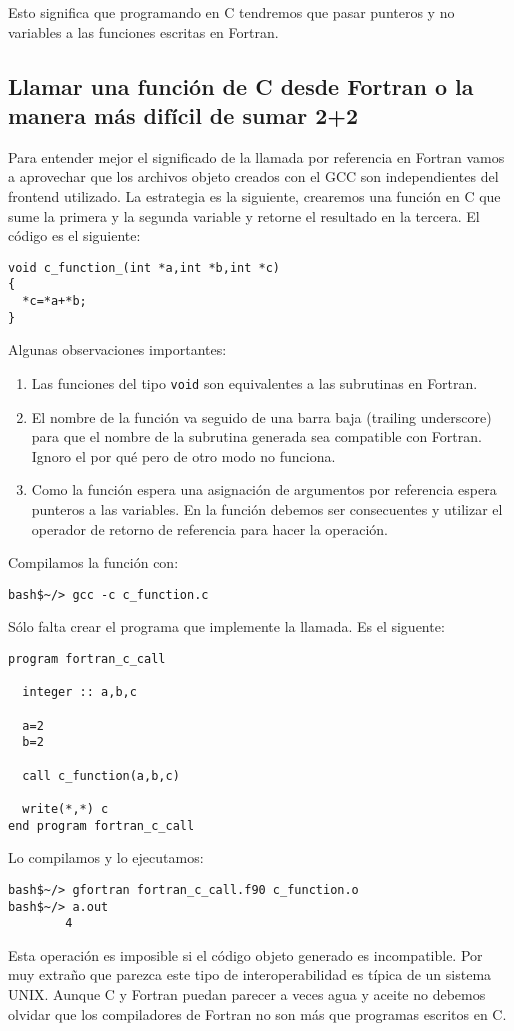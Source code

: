 Esto significa que programando en C tendremos que pasar punteros y no
variables a las funciones escritas en Fortran.


\subsection{Llamar una función de C desde Fortran o la manera más difícil de sumar 2+2}

Para entender mejor el significado de la llamada por referencia en
Fortran vamos a aprovechar que los archivos objeto creados con el GCC
son independientes del frontend utilizado.  La estrategia es la
siguiente, crearemos una función en C que sume la primera y la segunda
variable y retorne el resultado en la tercera.  El código es el
siguiente:
\begin{verbatim}
void c_function_(int *a,int *b,int *c)
{
  *c=*a+*b;
}
\end{verbatim}
Algunas observaciones importantes:
\begin{enumerate}
\item Las funciones del tipo \texttt{void} son equivalentes a las
  subrutinas en Fortran.
\item El nombre de la función va seguido de una barra baja (trailing
  underscore) para que el nombre de la subrutina generada sea
  compatible con Fortran.  Ignoro el por qué pero de otro modo no
  funciona.
\item Como la función espera una asignación de argumentos por
  referencia espera punteros a las variables.  En la función debemos
  ser consecuentes y utilizar el operador de retorno de referencia
  para hacer la operación.
\end{enumerate}
Compilamos la función con:
\begin{verbatim}
bash$~/> gcc -c c_function.c
\end{verbatim}

Sólo falta crear el programa que implemente la llamada.  Es el
siguente:
\begin{verbatim}
program fortran_c_call

  integer :: a,b,c

  a=2
  b=2

  call c_function(a,b,c)

  write(*,*) c
end program fortran_c_call
\end{verbatim}
Lo compilamos y lo ejecutamos:
\begin{verbatim}
bash$~/> gfortran fortran_c_call.f90 c_function.o
bash$~/> a.out
        4
\end{verbatim}
Esta operación es imposible si el código objeto generado es
incompatible. Por muy extraño que parezca este tipo de
interoperabilidad es típica de un sistema UNIX.  Aunque C y Fortran
puedan parecer a veces agua y aceite no debemos olvidar que los
compiladores de Fortran no son más que programas escritos en C.

